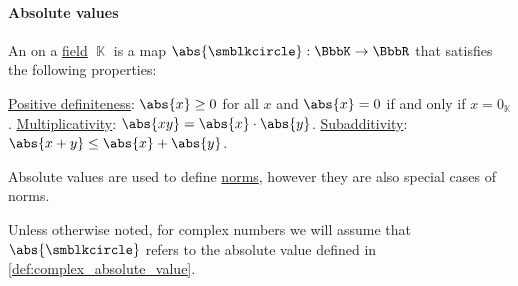 \paragraph{Absolute values}

\begin{definition}\label{def:absolute_value}
  An  on a \hyperref[def:field]{field} \( \BbbK \) is a map \( \abs{\anon}: \BbbK \to \BbbR \) that satisfies the following properties:
  \begin{thmenum}
     \hyperref[def:real_function_definiteness]{Positive definiteness}: \( \abs{x} \geq 0 \) for all \( x \) and \( \abs{x} = 0 \) if and only if \( x = 0_\BbbK \).
     \hyperref[def:multiplicative_function]{Multiplicativity}: \( \abs{xy} = \abs{x} \cdot \abs{y} \).
     \hyperref[def:additive_function/sub]{Subadditivity}: \( \abs{x + y} \leq \abs{x} + \abs{y} \).
  \end{thmenum}
\end{definition}
\begin{comments}
  \item Absolute values are used to define \hyperref[def:norm]{norms}, however they are also special cases of norms.
  \item Unless otherwise noted, for complex numbers we will assume that \( \abs{\anon} \) refers to the absolute value defined in \cref{def:complex_absolute_value}.
\end{comments}

